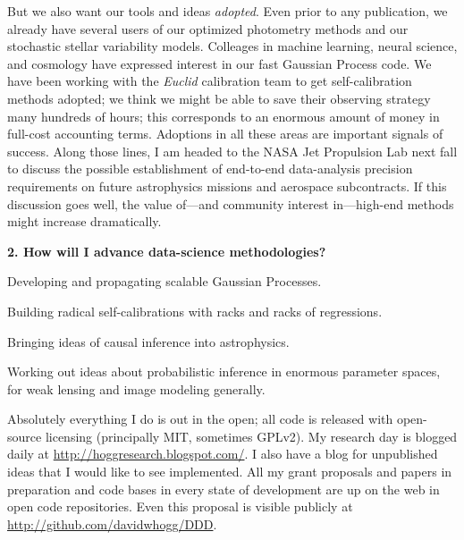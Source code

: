 \documentclass[11pt, letterpaper]{article}
\begin{document}
But we also want our tools and ideas \emph{adopted}.
Even prior to any publication, we already have several users of our
optimized photometry methods and our stochastic stellar variability
models.
Colleages in machine learning, neural science, and cosmology have
expressed interest in our fast Gaussian Process code.
We have been working with the \textsl{Euclid} calibration team to get
self-calibration methods adopted; we think we might be able to save
their observing strategy many hundreds of hours; this corresponds to an
enormous amount of money in full-cost accounting terms.
Adoptions in all these areas are important signals of success.
Along those lines, I am headed to the NASA Jet Propulsion Lab next
fall to discuss the possible establishment of end-to-end data-analysis
precision requirements on future astrophysics missions and aerospace
subcontracts.
If this discussion goes well, the value of---and community interest
in---high-end methods might increase dramatically.

\bigskip
\noindent\textbf{2. How will I advance data-science methodologies?}
\smallskip

Developing and propagating scalable Gaussian Processes.

Building radical self-calibrations with racks and racks of regressions.

Bringing ideas of causal inference into astrophysics.

Working out ideas about probabilistic inference in enormous parameter spaces,
for weak lensing and image modeling generally.

Absolutely everything I do is out in the open; all code is released
with open-source licensing (principally MIT, sometimes GPLv2).
My research day is blogged daily at
\url{http://hoggresearch.blogspot.com/}.
I also have a blog for unpublished ideas that I would like to see
implemented.
All my grant proposals and papers in preparation and code bases in
every state of development are up on the web in open code
repositories.
Even this proposal is visible publicly at
\url{http://github.com/davidwhogg/DDD}.
\end{document}
